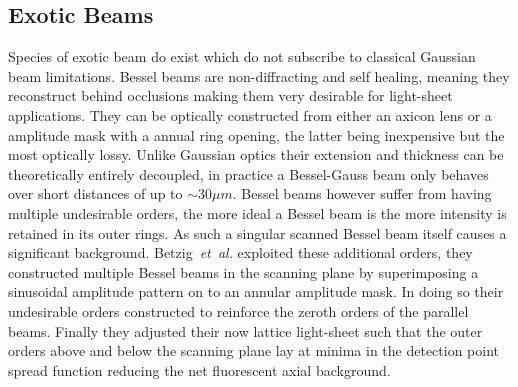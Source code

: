 \subsection{Exotic Beams}
Species of exotic beam do exist which do not subscribe to classical Gaussian beam limitations.
Bessel beams are non-diffracting and self healing, meaning they reconstruct behind occlusions making them very desirable for light-sheet applications.
They can be optically constructed from either an axicon lens or a amplitude mask with a annual ring opening, the latter being inexpensive but the most optically lossy.
Unlike Gaussian optics their extension and thickness can be theoretically entirely decoupled, in practice a Bessel-Gauss beam only behaves over short distances \cite{gao_3d_2014} of up to $\sim 30\mu m$.
Bessel beams however suffer from having multiple undesirable orders, the more ideal a Bessel beam is the more intensity is retained in its outer rings.
As such a singular scanned Bessel beam itself causes a significant background.
Betzig~\emph{et~al.}\cite{chen_lattice_2014} exploited these additional orders, they constructed multiple Bessel beams in the scanning plane by superimposing a sinusoidal amplitude pattern on to an annular amplitude mask.
In doing so their undesirable orders constructed to reinforce the zeroth orders of the parallel beams.
Finally they adjusted their now lattice light-sheet such that the outer orders above and below the scanning plane lay at minima in the detection point spread function reducing the net fluorescent axial background.
